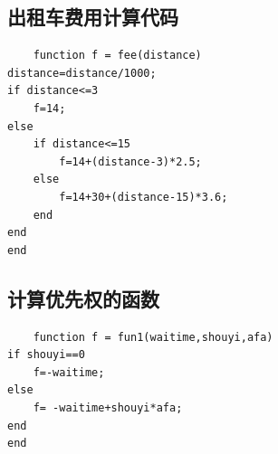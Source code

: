 \documentclass{cumcm}
\begin{document}
\subsection{出租车费用计算代码}
\begin{lstlisting}
	function f = fee(distance)
distance=distance/1000;
if distance<=3
    f=14;
else
    if distance<=15
        f=14+(distance-3)*2.5;
    else
        f=14+30+(distance-15)*3.6;
    end
end
end

\end{lstlisting}
\subsection{计算优先权的函数}
\begin{lstlisting}
	function f = fun1(waitime,shouyi,afa)
if shouyi==0
    f=-waitime;
else
    f= -waitime+shouyi*afa;
end
end
\end{lstlisting}
\end{document}
